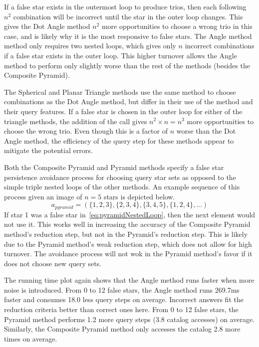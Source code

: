 If a false star exists in the outermost loop to produce trios, then each following $n^2$ combination will be incorrect
until the star in the outer loop changes.
This gives the Dot Angle method $n^2$ more opportunities to choose a wrong trio in this case, and is likely why it is
the most responsive to false stars.
The Angle method method only requires two nested loops, which gives only $n$ incorrect combinations if a false star
exists in the outer loop.
This higher turnover allows the Angle method to perform only slightly worse than the rest of the methods (besides
the Composite Pyramid).

The Spherical and Planar Triangle methods use the same method to choose combinations as the Dot Angle method, but differ
in their use of the  method and their query features.
If a false star is chosen in the outer loop for either of the triangle methods, the addition of the  call
gives $n^2 \times n = n^3$ more opportunities to choose the wrong trio.
Even though this is a factor of $n$ worse than the Dot Angle method, the efficiency of the query step for these
methods appear to mitigate the potential errors.

Both the Composite Pyramid and Pyramid methods specify a false star persistence avoidance process for choosing
query star sets as opposed to the simple triple nested loops of the other methods.
An example sequence of this process given an image of $n=5$ stars is depicted below.
\begin{equation}\label{eq:pyramidNestedLoop}
a_{pyramid} = ( \{1,2,3\}, \{2,3,4\}, \{3,4,5\}, \{1,2,4\}, \ldots)
\end{equation}
If star 1 was a false star in~\autoref{eq:pyramidNestedLoop}, then the next element would not use it.
This works well in increasing the accuracy of the Composite Pyramid method's reduction step, but not in the Pyramid's
reduction step.
This is likely due to the Pyramid method's weak reduction step, which does not allow for high turnover.
The avoidance process will not wok in the Pyramid method's favor if it does not choose new query sets.

The running time plot again shows that the Angle method runs faster when more noise is introduced.
From 0 to 12 false stars, the Angle method runs 269.7ms faster and consumes 18.0 less query steps on average.
Incorrect answers fit the reduction criteria better than correct ones here.
From 0 to 12 false stars, the Pyramid method performs 1.2 more query steps (3.8 catalog accesses) on average.
Similarly, the Composite Pyramid method only accesses the catalog 2.8 more times on average.


